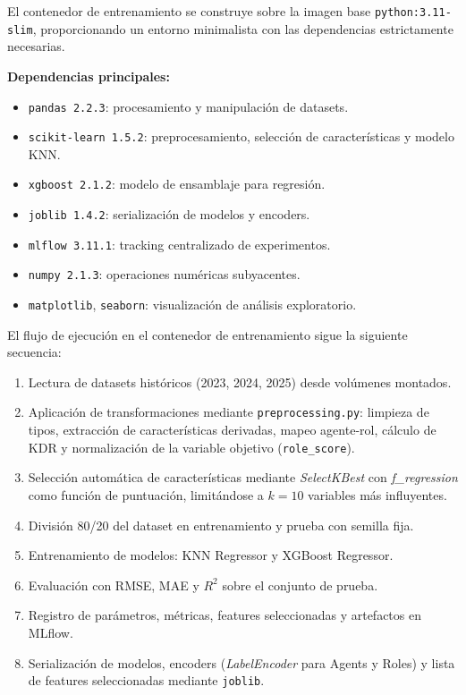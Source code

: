 \documentclass{ULBreport} %
\begin{document}
El contenedor de entrenamiento se construye sobre la imagen base \texttt{python:3.11-slim}, proporcionando un entorno minimalista con las dependencias estrictamente necesarias.

\textbf{Dependencias principales:}
\begin{itemize}
    \item \texttt{pandas 2.2.3}: procesamiento y manipulación de datasets.
    \item \texttt{scikit-learn 1.5.2}: preprocesamiento, selección de características y modelo KNN.
    \item \texttt{xgboost 2.1.2}: modelo de ensamblaje para regresión.
    \item \texttt{joblib 1.4.2}: serialización de modelos y encoders.
    \item \texttt{mlflow 3.11.1}: tracking centralizado de experimentos.
    \item \texttt{numpy 2.1.3}: operaciones numéricas subyacentes.
    \item \texttt{matplotlib}, \texttt{seaborn}: visualización de análisis exploratorio.
\end{itemize}

El flujo de ejecución en el contenedor de entrenamiento sigue la siguiente secuencia:

\begin{enumerate}
    \item Lectura de datasets históricos (2023, 2024, 2025) desde volúmenes montados.
    \item Aplicación de transformaciones mediante \texttt{preprocessing.py}: limpieza de tipos, extracción de características derivadas, mapeo agente-rol, cálculo de KDR y normalización de la variable objetivo (\texttt{role\_score}).
    \item Selección automática de características mediante \textit{SelectKBest} con \textit{f\_regression} como función de puntuación, limitándose a $k=10$ variables más influyentes.
    \item División 80/20 del dataset en entrenamiento y prueba con semilla fija.
    \item Entrenamiento de modelos: KNN Regressor y XGBoost Regressor.
    \item Evaluación con RMSE, MAE y $R^2$ sobre el conjunto de prueba.
    \item Registro de parámetros, métricas, features seleccionadas y artefactos en MLflow.
    \item Serialización de modelos, encoders (\textit{LabelEncoder} para Agents y Roles) y lista de features seleccionadas mediante \texttt{joblib}.
\end{enumerate}
\end{document}
